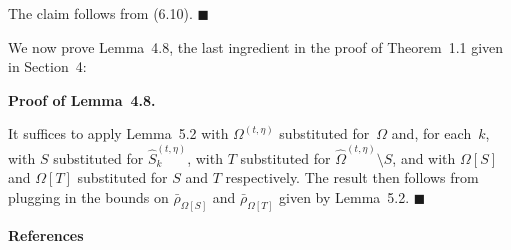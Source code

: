 The claim follows from (6.10).
\ensuremath{\blacksquare}\par





We now prove Lemma 4.8, the last ingredient in the proof of Theorem 1.1 given in Section 4:\par




\par\medskip\noindent\textbf{Proof of Lemma 4.8.}\par



It suffices to apply Lemma 5.2 with $\Omega^{(t,\eta)}$ substituted for $\Omega$ and, for each $k$, with $S$ substituted for $\hat{S}_{k}^{(t,\eta)}$, with $T$ substituted for $\hat{\Omega}^{(t,\eta)}\setminus S$, and with $\Omega[S]$ and $\Omega[T]$ substituted for $S$ and $T$ respectively. The result then follows from plugging in the bounds on $\bar{\rho}_{\Omega[S]}$ and $\bar{\rho}_{\Omega[T]}$ given by Lemma 5.2.
\ensuremath{\blacksquare}\par






\par\medskip\noindent\textbf{References}\par



